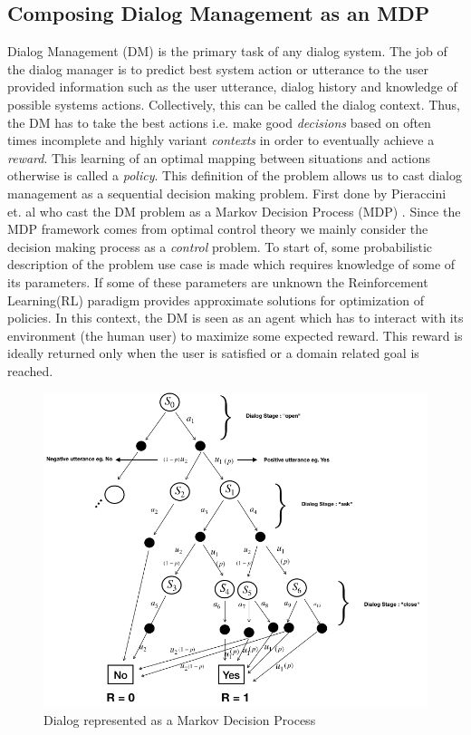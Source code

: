 \documentclass[12pt]{extarticle}
\numberwithin{equation}{section}
\begin{document}
	\subsection{Composing Dialog Management as an MDP}\label{dialog-mdp}
	Dialog Management (DM) \cite{Young99probabilisticmethods} is the primary task of any dialog system. The job of the dialog manager is to predict best system action or utterance to the user provided information such as the user utterance, dialog history and knowledge of possible systems actions. Collectively, this can be called the dialog context. Thus, the DM has to take the best actions i.e. make good \textit{decisions} based on often times incomplete and highly variant \textit{contexts} in order to eventually achieve a \textit{reward}. This learning of an optimal mapping between situations and actions otherwise is called a \textit{policy}. This definition of the problem allows us to cast dialog management as a sequential decision making problem. First done by Pieraccini et. al \cite{mdp-pieraccini} who cast the DM problem as a Markov Decision Process (MDP) \cite{mdp-bellmann}. Since the MDP framework comes from optimal control theory we mainly consider the decision making process as a \textit{control} problem. To start of, some probabilistic description of the problem use case is made which requires knowledge of some of its parameters. If some of these parameters are unknown the Reinforcement Learning(RL) paradigm \cite{Sutton-introRL} provides approximate solutions for optimization of policies. In this context, the DM is seen as an agent which has to interact with its environment (the human user) to maximize some expected reward. This reward is ideally returned only when the user is satisfied or a domain related goal is reached.
	\begin{figure}[H]
		\includegraphics[scale=0.65]{user-env4-2}
		\centering
		\caption{Dialog represented as a Markov Decision Process
			\label{chat-world3}}
	\end{figure}
\end{document}
